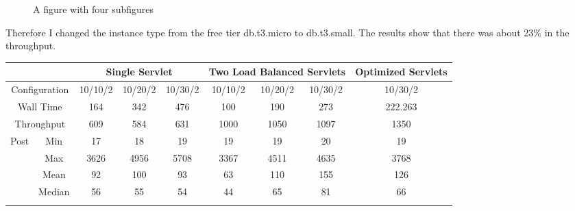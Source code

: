\documentclass[a4paper,12pt]{article} %
\begin{document}
\begin{enumerate}
\begin{figure}[H]
    \caption{A figure with four subfigures}
    \label{fig:roc}
\end{figure}
  

Therefore I changed the instance type from the free tier db.t3.micro to db.t3.small. The results show that there
was about 23\% in the throughput.

\begin{table}[H]
    \centering
    \begin{tabular}{|cc|ccc|ccc|c|}
    \hline
    \multicolumn{2}{|c|}{}                               & \multicolumn{3}{c|}{Single Servlet}                                   & \multicolumn{3}{c|}{Two Load Balanced Servlets}                       & Optimized Servlets \\ \hline
    \multicolumn{2}{|c|}{Configuration}                  & \multicolumn{1}{c|}{10/10/2} & \multicolumn{1}{c|}{10/20/2} & 10/30/2 & \multicolumn{1}{c|}{10/10/2} & \multicolumn{1}{c|}{10/20/2} & 10/30/2 & 10/30/2            \\ \hline
    \multicolumn{2}{|c|}{Wall Time}                      & \multicolumn{1}{c|}{164}     & \multicolumn{1}{c|}{342}     & 476     & \multicolumn{1}{c|}{100}     & \multicolumn{1}{c|}{190}     & 273     & 222.263            \\ \hline
    \multicolumn{2}{|c|}{Throughput}                     & \multicolumn{1}{c|}{609}     & \multicolumn{1}{c|}{584}     & 631     & \multicolumn{1}{c|}{1000}    & \multicolumn{1}{c|}{1050}    & 1097    & 1350               \\ \hline
    \multicolumn{1}{|c|}{\multirow{5}{*}{Post}} & Min    & \multicolumn{1}{c|}{17}      & \multicolumn{1}{c|}{18}      & 19      & \multicolumn{1}{c|}{19}      & \multicolumn{1}{c|}{19}      & 20      & 19                 \\ \cline{2-9} 
    \multicolumn{1}{|c|}{}                      & Max    & \multicolumn{1}{c|}{3626}    & \multicolumn{1}{c|}{4956}    & 5708    & \multicolumn{1}{c|}{3367}    & \multicolumn{1}{c|}{4511}    & 4635    & 3768               \\ \cline{2-9} 
    \multicolumn{1}{|c|}{}                      & Mean   & \multicolumn{1}{c|}{92}      & \multicolumn{1}{c|}{100}     & 93      & \multicolumn{1}{c|}{63}      & \multicolumn{1}{c|}{110}     & 155     & 126                \\ \cline{2-9} 
    \multicolumn{1}{|c|}{}                      & Median & \multicolumn{1}{c|}{56}      & \multicolumn{1}{c|}{55}      & 54      & \multicolumn{1}{c|}{44}      & \multicolumn{1}{c|}{65}      & 81      & 66                 \\ \cline{2-9} 

\end{tabular}
\end{table}
\end{enumerate}
\end{document}
